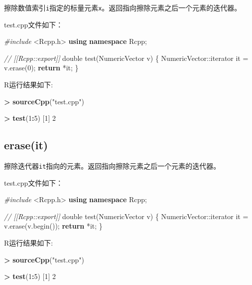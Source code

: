 \documentclass[]{ctexbook}
\newenvironment{Shaded}{\begin{snugshade}}{\end{snugshade}}
\newcommand{\KeywordTok}[1]{\textcolor[rgb]{0.13,0.29,0.53}{\textbf{#1}}}
\newcommand{\DataTypeTok}[1]{\textcolor[rgb]{0.13,0.29,0.53}{#1}}
\newcommand{\DecValTok}[1]{\textcolor[rgb]{0.00,0.00,0.81}{#1}}
\newcommand{\StringTok}[1]{\textcolor[rgb]{0.31,0.60,0.02}{#1}}
\newcommand{\ImportTok}[1]{#1}
\newcommand{\CommentTok}[1]{\textcolor[rgb]{0.56,0.35,0.01}{\textit{#1}}}
\newcommand{\ControlFlowTok}[1]{\textcolor[rgb]{0.13,0.29,0.53}{\textbf{#1}}}
\newcommand{\OperatorTok}[1]{\textcolor[rgb]{0.81,0.36,0.00}{\textbf{#1}}}
\newcommand{\PreprocessorTok}[1]{\textcolor[rgb]{0.56,0.35,0.01}{\textit{#1}}}
\newcommand{\NormalTok}[1]{#1}
\begin{document}
擦除数值索引\texttt{i}指定的标量元素\texttt{x}。返回指向擦除元素之后一个元素的迭代器。

test.cpp文件如下：

\begin{Shaded}
\begin{Highlighting}[]
\PreprocessorTok{#include }\ImportTok{<Rcpp.h>}
\KeywordTok{using} \KeywordTok{namespace}\NormalTok{ Rcpp;}

\CommentTok{// [[Rcpp::export]]}
\DataTypeTok{double}\NormalTok{ test(NumericVector v) \{}
\NormalTok{  NumericVector::iterator it = v.erase(}\DecValTok{0}\NormalTok{);}
  \ControlFlowTok{return}\NormalTok{ *it;}
\NormalTok{\}}
\end{Highlighting}
\end{Shaded}

R运行结果如下:

\begin{Shaded}
\begin{Highlighting}[]
\OperatorTok{>}\StringTok{ }\KeywordTok{sourceCpp}\NormalTok{(}\StringTok{"test.cpp"}\NormalTok{)}

\OperatorTok{>}\StringTok{ }\KeywordTok{test}\NormalTok{(}\DecValTok{1}\OperatorTok{:}\DecValTok{5}\NormalTok{)}
\NormalTok{[}\DecValTok{1}\NormalTok{] }\DecValTok{2}
\end{Highlighting}
\end{Shaded}

\subsection{erase(it)}\label{vector-eraseit}

擦除迭代器\texttt{it}指向的元素。返回指向擦除元素之后一个元素的迭代器。

test.cpp文件如下：

\begin{Shaded}
\begin{Highlighting}[]
\PreprocessorTok{#include }\ImportTok{<Rcpp.h>}
\KeywordTok{using} \KeywordTok{namespace}\NormalTok{ Rcpp;}

\CommentTok{// [[Rcpp::export]]}
\DataTypeTok{double}\NormalTok{ test(NumericVector v) \{}
\NormalTok{  NumericVector::iterator it = v.erase(v.begin());}
  \ControlFlowTok{return}\NormalTok{ *it;}
\NormalTok{\}}
\end{Highlighting}
\end{Shaded}

R运行结果如下:

\begin{Shaded}
\begin{Highlighting}[]
\OperatorTok{>}\StringTok{ }\KeywordTok{sourceCpp}\NormalTok{(}\StringTok{"test.cpp"}\NormalTok{)}

\OperatorTok{>}\StringTok{ }\KeywordTok{test}\NormalTok{(}\DecValTok{1}\OperatorTok{:}\DecValTok{5}\NormalTok{)}
\NormalTok{[}\DecValTok{1}\NormalTok{] }\DecValTok{2}
\end{Highlighting}
\end{Shaded}
\end{document}
